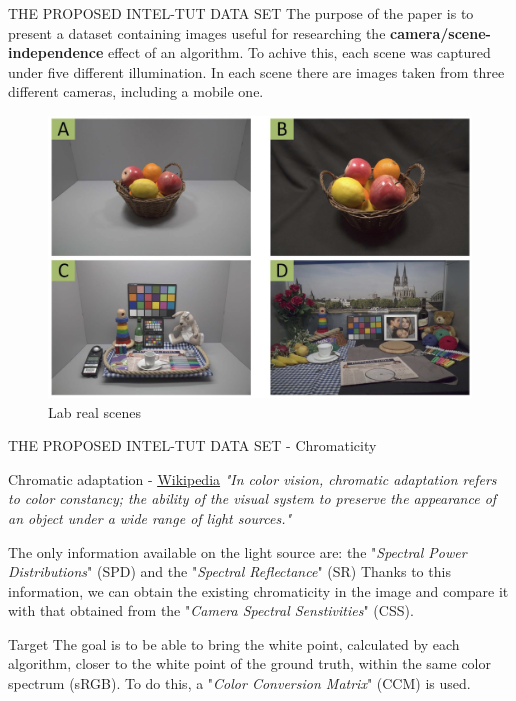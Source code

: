\documentclass[10pt]{beamer}
\begin{document}
\begin{frame}{THE PROPOSED INTEL-TUT DATA SET}
    The purpose of the paper is to present a dataset containing images useful 
    for researching the {\bfseries{camera/scene-independence}} effect of an algorithm.
    To achive this, each scene was captured under five different illumination. 
    In each scene there are images taken from three different cameras, 
    including a mobile one.
    \begin{figure}[htbp]
        \centering
        \includegraphics[width = 0.6 \linewidth]{images/paper4/lab.png}
        \centering
        \caption{Lab real scenes}
        \label{fig:Lab}
    \end{figure}
\end{frame}

\begin{frame}{THE PROPOSED INTEL-TUT DATA SET - Chromaticity}
    \begin{block}{Chromatic adaptation - \href{https://en.wikipedia.org/wiki/Color_vision}{\underline{Wikipedia}}}
        \emph{"In color vision, chromatic adaptation refers to color constancy; the 
        ability of the visual system to preserve the appearance of an object under 
        a wide range of light sources."}
    \end{block}
    The only information available on the light source are: the "\emph{Spectral 
    Power Distributions}" (SPD) and the "\emph{Spectral Reflectance}" (SR)
    Thanks to this information, we can obtain the existing chromaticity in the image 
    and compare it with that obtained from the "\emph{Camera Spectral Senstivities}" (CSS).
    \begin{block}{Target}
        The goal is to be able to bring the white point, calculated by each 
        algorithm, closer to the white point of the ground truth, within the same 
        color spectrum (sRGB). To do this, a "\emph{Color Conversion Matrix}" (CCM) 
        is used.
    \end{block}
\end{frame}
\end{document}
